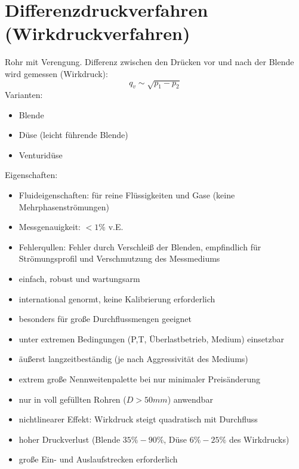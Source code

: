 \section{Differenzdruckverfahren (Wirkdruckverfahren)}
Rohr mit Verengung. Differenz zwischen den Drücken vor und nach der Blende wird gemessen (Wirkdruck):
$$q_v\sim \sqrt{p_1-p_2}$$
Varianten:
\begin{itemize}
\item Blende
\item Düse (leicht führende Blende)
\item Venturidüse
\end{itemize}
Eigenschaften:
\begin{itemize}
\item Fluideigenschaften: für reine Flüssigkeiten und Gase (keine Mehrphasenströmungen)
\item Messgenauigkeit: $<1\%$ v.E.
\item Fehlerqullen: Fehler durch Verschleiß der Blenden, empfindlich für Strömungsprofil und Verschmutzung des Messmediums
\end{itemize}
\begin{itemize}[label=$+$]
\item einfach, robust und wartungsarm
\item international genormt, keine Kalibrierung erforderlich
\item besonders für große Durchflussmengen geeignet
\item unter extremen Bedingungen (P,T, Überlastbetrieb, Medium) einsetzbar
\item äußerst langzeitbeständig (je nach Aggressivität des Mediums)
\item extrem große Nennweitenpalette bei nur minimaler Preisänderung
\end{itemize}
\begin{itemize}[label=$-$]
\item nur in voll gefüllten Rohren ($D > 50\unit{mm}$) anwendbar
\item nichtlinearer Effekt: Wirkdruck steigt quadratisch mit Durchfluss
\item hoher Druckverlust (Blende $35\%-90\%$, Düse $6\%-25\%$ des Wirkdrucks)
\item große Ein- und Auslaufstrecken erforderlich
\end{itemize}

